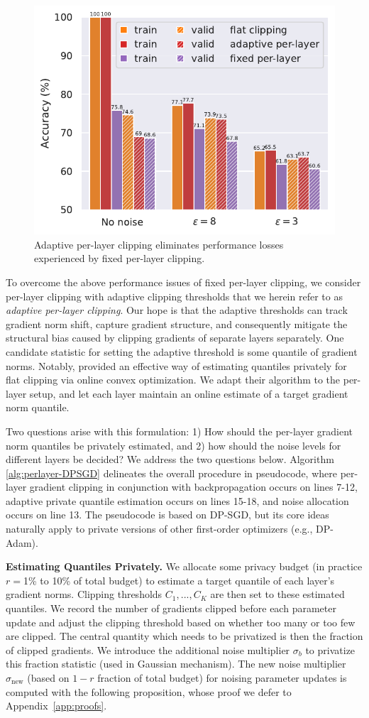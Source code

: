 \begin{figure}
    \centering
    \vspace{-4mm}
    \includegraphics[width=.38\textwidth]{files/fig/cifar_withour_noise_single.pdf}
    \caption{Adaptive per-layer clipping eliminates performance losses experienced by fixed per-layer clipping.}
    \label{fig:cifar_without_noise}
\end{figure}
To overcome the above performance issues of fixed per-layer clipping, we consider per-layer clipping with adaptive clipping thresholds that we herein refer to as \emph{adaptive per-layer clipping}. 
Our hope is that the adaptive thresholds can track gradient norm shift, capture gradient structure, and consequently mitigate the structural bias caused by clipping gradients of separate layers separately. 
One candidate statistic for setting the adaptive threshold is some quantile of gradient norms. 
Notably, \cite{andrew2019differentially} provided an effective way of estimating  quantiles privately for flat clipping via online convex optimization.
We adapt their algorithm to the per-layer setup, and let each layer maintain an online estimate of a target gradient norm quantile. %


Two questions arise with this formulation: 1) How should the per-layer gradient norm quantiles be privately estimated, and 2) how should the noise levels for different layers be decided? 
We address the two questions below. 
Algorithm \ref{alg:perlayer-DPSGD} delineates the overall procedure in pseudocode, where per-layer gradient clipping in conjunction with backpropagation occurs on lines 7-12, adaptive private quantile estimation occurs on lines 15-18, and noise allocation occurs on line 13. 
The pseudocode is based on DP-SGD, but its core ideas naturally apply to private versions of other first-order optimizers (e.g., DP-Adam).




\textbf{Estimating Quantiles Privately.}  We allocate some privacy budget (in practice $r=$1\% to 10\% of total budget) to estimate a target quantile of each layer's gradient norms. 
Clipping thresholds $C_1, ..., C_K$ are then set to these estimated quantiles. 
We record the number of gradients clipped before each parameter update and adjust the clipping threshold based on whether too many or too few are clipped. 
The central quantity which needs to be privatized is then the fraction of clipped gradients.
We introduce the additional noise multiplier $\sigma_{b}$ to privatize this fraction statistic (used in Gaussian mechanism). 
The new noise multiplier $\sigma_\text{new}$ (based on $1-r$ fraction of total budget) for noising parameter updates is computed with the following proposition, whose proof we defer to Appendix~\ref{app:proofs}.


